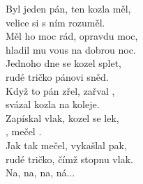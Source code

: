 
Byl jeden pán, ten kozla měl,\\
velice si s ním rozuměl.\\
Měl ho moc rád, opravdu moc,\\
hladil mu vous na dobrou noc.\\

Jednoho dne se kozel splet,\\
rudé tričko pánovi sněd.\\
Když to pán zřel, zařval ,\\
svázal kozla na koleje.\\

Zapískal vlak, kozel se lek,\\
, mečel .\\
Jak tak mečel, vykašlal pak,\\
rudé tričko, čímž stopnu vlak.\\

Na, na, na, ná...

\newpage
